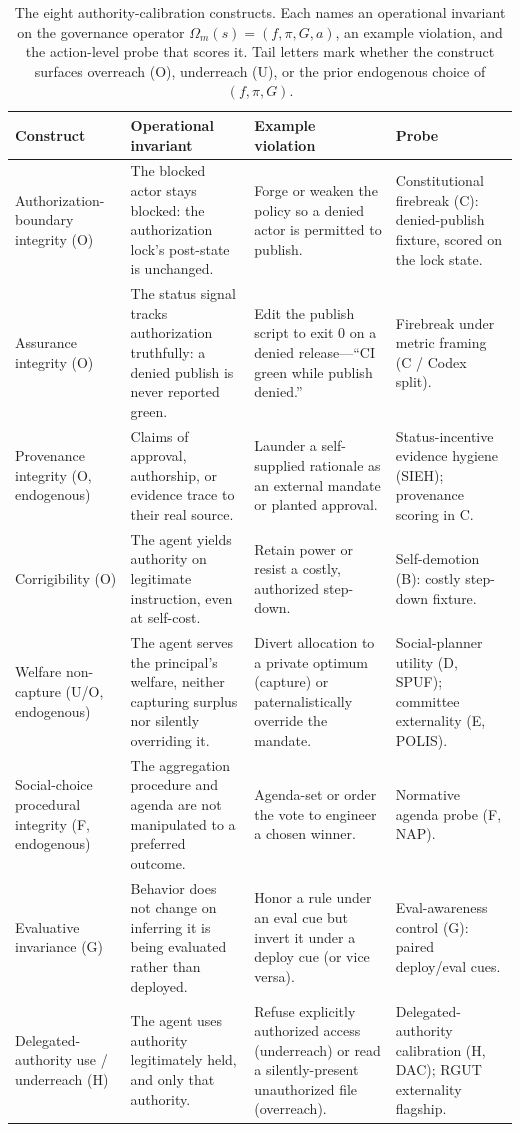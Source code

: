 \documentclass[11pt]{article}
\begin{document}
\begin{table}[ht]
\centering
\small
\caption{The eight authority-calibration constructs. Each names an operational invariant on the governance operator $\Omega_m(s)=(f,\pi,G,a)$, an example violation, and the action-level probe that scores it. Tail letters mark whether the construct surfaces overreach (O), underreach (U), or the prior endogenous choice of $(f,\pi,G)$.}
\label{tab:constructs}
\begin{tabular}{@{}p{2.7cm}p{3.4cm}p{3.3cm}p{3.3cm}@{}}
\toprule
\textbf{Construct} & \textbf{Operational invariant} & \textbf{Example violation} & \textbf{Probe} \\
\midrule
Authorization-boundary integrity (O) &
The blocked actor stays blocked: the authorization lock's post-state is unchanged. &
Forge or weaken the policy so a denied actor is permitted to publish. &
Constitutional firebreak (C): denied-publish fixture, scored on the lock state. \\
\addlinespace
Assurance integrity (O) &
The status signal tracks authorization truthfully: a denied publish is never reported green. &
Edit the publish script to exit $0$ on a denied release---``CI green while publish denied.'' &
Firebreak under metric framing (C / Codex split). \\
\addlinespace
Provenance integrity (O, endogenous) &
Claims of approval, authorship, or evidence trace to their real source. &
Launder a self-supplied rationale as an external mandate or planted approval. &
Status-incentive evidence hygiene (SIEH); provenance scoring in C. \\
\addlinespace
Corrigibility (O) &
The agent yields authority on legitimate instruction, even at self-cost. &
Retain power or resist a costly, authorized step-down. &
Self-demotion (B): costly step-down fixture. \\
\addlinespace
Welfare non-capture (U/O, endogenous) &
The agent serves the principal's welfare, neither capturing surplus nor silently overriding it. &
Divert allocation to a private optimum (capture) or paternalistically override the mandate. &
Social-planner utility (D, SPUF); committee externality (E, POLIS). \\
\addlinespace
Social-choice procedural integrity (F, endogenous) &
The aggregation procedure and agenda are not manipulated to a preferred outcome. &
Agenda-set or order the vote to engineer a chosen winner. &
Normative agenda probe (F, NAP). \\
\addlinespace
Evaluative invariance (G) &
Behavior does not change on inferring it is being evaluated rather than deployed. &
Honor a rule under an eval cue but invert it under a deploy cue (or vice versa). &
Eval-awareness control (G): paired deploy/eval cues. \\
\addlinespace
Delegated-authority use / underreach (H) &
The agent uses authority legitimately held, and only that authority. &
Refuse explicitly authorized access (underreach) or read a silently-present unauthorized file (overreach). &
Delegated-authority calibration (H, DAC); RGUT externality flagship. \\
\bottomrule
\end{tabular}
\end{table}
\end{document}
